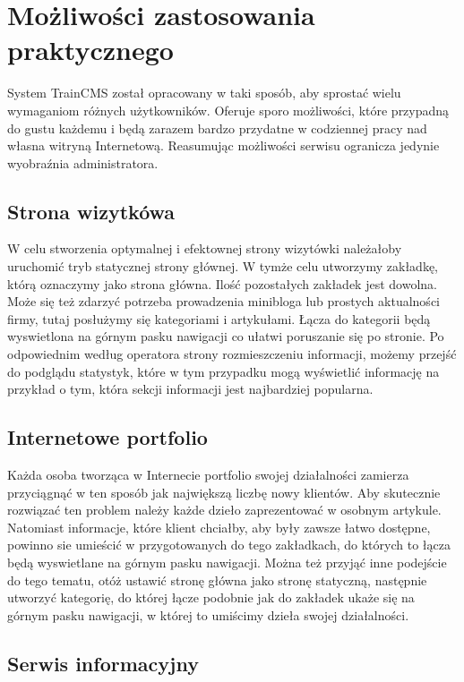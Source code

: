 \documentclass[openright]{xmgr}
\begin{document}
\newpage

\section{Możliwości zastosowania praktycznego}

System TrainCMS został opracowany w taki sposób, aby sprostać wielu wymaganiom różnych użytkowników. Oferuje sporo możliwości, które przypadną do gustu każdemu i będą zarazem bardzo przydatne w codziennej pracy nad własna witryną Internetową. Reasumując możliwości serwisu ogranicza jedynie wyobraźnia administratora.

\subsection{Strona wizytkówa}

W celu stworzenia optymalnej i efektownej strony wizytówki należałoby uruchomić tryb statycznej strony głównej. W tymże celu utworzymy zakładkę, którą oznaczymy jako strona główna. Ilość pozostałych zakładek jest dowolna. Może się też zdarzyć potrzeba prowadzenia minibloga lub prostych aktualności firmy, tutaj posłużymy się kategoriami i artykułami. Łącza do kategorii będą wyswietlona na górnym pasku nawigacji co ułatwi poruszanie się po stronie.  Po odpowiednim według operatora strony rozmieszczeniu informacji, możemy przejść do podglądu statystyk, które w tym przypadku mogą wyświetlić informację na przykład o tym, która sekcji informacji jest najbardziej popularna. 

\subsection{Internetowe portfolio}

Każda osoba tworząca w Internecie portfolio swojej działalności zamierza przyciągnąć w ten sposób jak największą liczbę nowy klientów. Aby skutecznie rozwiązać ten problem należy każde dzieło zaprezentować w osobnym artykule. Natomiast informacje, które klient chciałby, aby były zawsze łatwo dostępne, powinno sie umieścić w przygotowanych do tego zakładkach, do których to łącza będą wyswietlane na górnym pasku nawigacji. Można też przyjąć inne podejście do tego tematu, otóż ustawić stronę główna jako stronę statyczną, następnie utworzyć kategorię, do której łącze podobnie jak do zakładek ukaże się na górnym pasku nawigacji, w której to umiścimy dzieła swojej działalności. 

\subsection{Serwis informacyjny}
\end{document}

